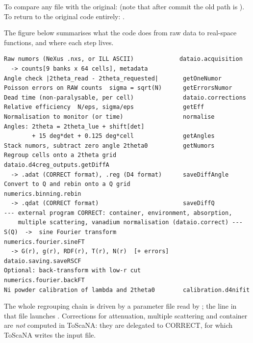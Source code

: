 \documentclass[11pt,a4paper]{article}
\begin{document}
\noindent To compare any file with the original: 
(note that after commit  the old path is ).
To return to the original code entirely: .

\label{sec:chain}

The figure below summarises what the code does from raw data to
real-space functions, and where each step lives.

\begin{lstlisting}
Raw numors (NeXus .nxs, or ILL ASCII)             dataio.acquisition
  -> counts[9 banks x 64 cells], metadata
Angle check |2theta_read - 2theta_requested|       getOneNumor
Poisson errors on RAW counts  sigma = sqrt(N)      getErrorsNumor
Dead time (non-paralysable, per cell)              dataio.corrections
Relative efficiency  N/eps, sigma/eps              getEff
Normalisation to monitor (or time)                 normalise
Angles: 2theta = 2theta_lue + shift[det]
        + 15 deg*det + 0.125 deg*cell              getAngles
Stack numors, subtract zero angle 2theta0          getNumors
Regroup cells onto a 2theta grid                   dataio.d4creg_outputs.getDiffA
  -> .adat (CORRECT format), .reg (D4 format)      saveDiffAngle
Convert to Q and rebin onto a Q grid               numerics.binning.rebin
  -> .qdat (CORRECT format)                        saveDiffQ
--- external program CORRECT: container, environment, absorption,
    multiple scattering, vanadium normalisation (dataio.correct) ---
S(Q)  ->  sine Fourier transform                   numerics.fourier.sineFT
  -> G(r), g(r), RDF(r), T(r), N(r)  [+ errors]    dataio.saving.saveRSCF
Optional: back-transform with low-r cut            numerics.fourier.backFT
Ni powder calibration of lambda and 2theta0        calibration.d4nifit
\end{lstlisting}

\noindent The whole regrouping chain is driven by a parameter file read by
; the line  in that file
launches . Corrections for attenuation,
multiple scattering and container are \emph{not} computed in ToScaNA: they
are delegated to CORRECT, for which ToScaNA writes the input file.

\label{sec:conventions}
\end{document}
